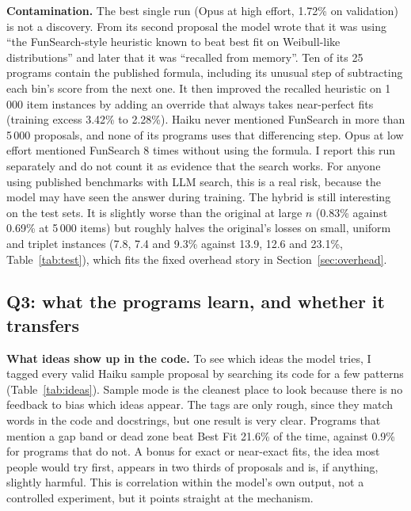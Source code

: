 \documentclass[10pt]{article}
\begin{document}
\textbf{Contamination.} The best single run (Opus at high effort, 1.72\% on validation) is not a
discovery. From its second proposal the model wrote that it was using ``the FunSearch-style
heuristic known to beat best fit on Weibull-like distributions'' and later that it was ``recalled from
memory''. Ten of its 25 programs contain the published formula, including its unusual step of
subtracting each bin's score from the next one. It then improved the recalled heuristic on 1\,000 item
instances by adding an override that always takes near-perfect fits (training excess 3.42\% to
2.28\%). Haiku never mentioned FunSearch in more than 5\,000 proposals, and none of its programs
uses that differencing step. Opus at low effort mentioned FunSearch 8 times without using the
formula. I report this run separately and do not count it as evidence that the search works. For
anyone using published benchmarks with LLM search, this is a real risk, because the model may have
seen the answer during training. The hybrid is still interesting on the test sets. It is slightly
worse than the original at large $n$ (0.83\% against 0.69\% at 5\,000 items) but roughly halves the
original's losses on small, uniform and triplet instances (7.8, 7.4 and 9.3\% against 13.9, 12.6 and
23.1\%, Table~\ref{tab:test}), which fits the fixed overhead story in Section~\ref{sec:overhead}.

\subsection{Q3: what the programs learn, and whether it transfers}\label{sec:mech}
\textbf{What ideas show up in the code.} To see which ideas the model tries, I tagged every valid
Haiku sample proposal by searching its code for a few patterns (Table~\ref{tab:ideas}). Sample mode is
the cleanest place to look because there is no feedback to bias which ideas appear. The tags are only
rough, since they match words in the code and docstrings, but one result is very clear. Programs that
mention a gap band or dead zone beat Best Fit 21.6\% of the time, against 0.9\% for programs that do
not. A bonus for exact or near-exact fits, the idea most people would try first, appears in two thirds
of proposals and is, if anything, slightly harmful. This is correlation within the model's own
output, not a controlled experiment, but it points straight at the mechanism.

\begin{table}[t]
\centering\small

\caption{Ideas found in the code of the 3\,299 valid Haiku low sample proposals (base rate of beating
Best Fit: 10.1\%). ``Share'' is the share of proposals with the tag. Tags are regular expressions on
the code, so they are approximate. Rarer tags (under 5\%) are left out.}
\label{tab:ideas}
\end{table}
\end{document}
